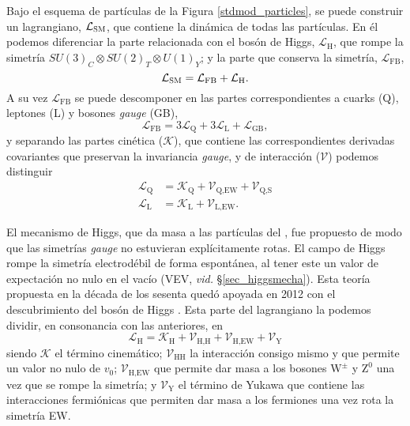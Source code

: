 Bajo el esquema de partículas de la Figura \ref{stdmod_particles}, se puede construir un lagrangiano, $\mathcal{L}_{\text{\textsc{SM}}}$, que contiene la dinámica de todas las partículas. En él podemos diferenciar la parte relacionada con el bosón de Higgs, $\mathcal{L}_{\text{H}}$, que rompe la simetría $ SU(3)_C \otimes SU(2)_T \otimes U(1)_Y $; y la parte que conserva la simetría, $\mathcal{L}_{\text{FB}}$,
\begin{equation}
\mathcal{L}_{\text{\textsc{SM}}} = \mathcal{L}_{\text{FB}} + \mathcal{L}_{\text{H}}.
\end{equation}
A su vez $\mathcal{L}_{\text{FB}}$ se puede descomponer en las partes correspondientes a cuarks (Q), leptones (L) y bosones \emph{gauge} (GB),
\begin{equation}
\mathcal{L}_{\text{FB}} = 3 \mathcal{L}_{\text{Q}} + 3 \mathcal{L}_{\text{L}} + \mathcal{L}_{\text{GB}},	
\end{equation}
y separando las partes cinética ($\mathcal{K}$), que contiene las correspondientes derivadas covariantes que preservan la invariancia \emph{gauge}, y de interacción ($\mathcal{V}$) podemos distinguir
\begin{equation}
\begin{split}
\mathcal{L}_{\text{Q}} &= \mathcal{K}_{\text{Q}} + \mathcal{V}_{\text{Q,EW}} + \mathcal{V}_{\text{Q,S}} \\
\mathcal{L}_{\text{L}} &= \mathcal{K}_{\text{L}} + \mathcal{V}_{\text{L,EW}} .
\end{split}	
\end{equation}

El mecanismo de Higgs, que da masa a las partículas del \stdmod, fue propuesto de modo que las simetrías \emph{gauge} no estuvieran explícitamente rotas. El campo de Higgs rompe la simetría electrodébil de forma espontánea, al tener este un valor de expectación no nulo en el vacío (VEV, \emph{vid.} \S \ref{sec_higgsmecha}). Esta teoría propuesta en la década de los sesenta quedó \color{vero} apoyada \color{norm} en 2012 con el descubrimiento del bosón de Higgs \cite{Aad:2012tfa,Chatrchyan:2012xdj}. Esta parte del lagrangiano la podemos dividir, en consonancia con las anteriores, en
\[\mathcal{L}_{\text{H}} = \mathcal{K}_{\text{H}} + \mathcal{V}_{\text{H,H}} + \mathcal{V}_{\text{H,EW}} + \mathcal{V}_{\text{Y}}\]
siendo $\mathcal{K}$ el término cinemático; $\mathcal{V}_{\text{HH}}$ la interacción consigo mismo y que permite un valor no nulo de $v_0$; $\mathcal{V}_{\text{H,EW}}$ 
que permite dar masa a los bosones $\mathrm{W^{\pm}}$ y $\mathrm{Z^0}$ una vez que se rompe la simetría; y  $\mathcal{V}_{\text{Y}}$ el término de Yukawa que contiene las interacciones fermiónicas que permiten dar masa a los fermiones una vez rota la simetría EW.


